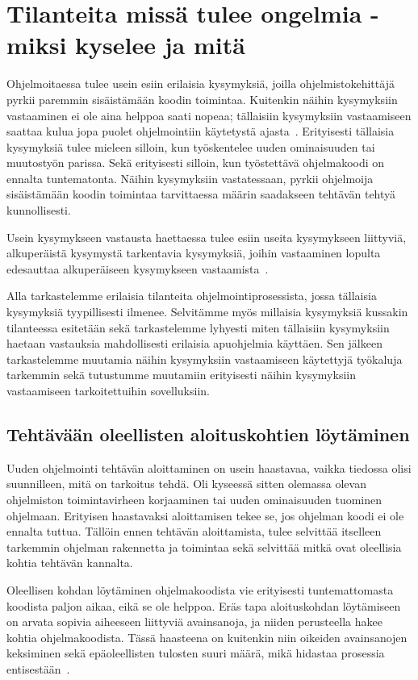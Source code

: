 \documentclass[finnish]{../tktltiki2}
\theoremstyle{definition}
\theoremstyle{remark}
\begin{document}
\section{Tilanteita missä tulee ongelmia - miksi kyselee ja mitä}
Ohjelmoitaessa tulee usein esiin erilaisia kysymyksiä, joilla ohjelmistokehittäjä pyrkii paremmin sisäistämään koodin toimintaa. Kuitenkin näihin kysymyksiin vastaaminen ei ole aina helppoa saati nopeaa; tällaisiin kysymyksiin vastaamiseen saattaa kulua jopa puolet ohjelmointiin käytetystä ajasta~\cite{eliciting-design-requirements-for-maintenance-oriented-ides}. Erityisesti tällaisia kysymyksiä tulee mieleen silloin, kun työskentelee uuden ominaisuuden tai muutostyön parissa. Sekä erityisesti silloin, kun työstettävä ohjelmakoodi on ennalta tuntematonta.
Näihin kysymyksiin vastatessaan, pyrkii ohjelmoija sisäistämään koodin toimintaa tarvittaessa määrin saadakseen tehtävän tehtyä kunnollisesti.

Usein kysymykseen vastausta haettaessa tulee esiin useita kysymykseen liittyviä, alkuperäistä kysymystä tarkentavia kysymyksiä, joihin vastaaminen lopulta edesauttaa alkuperäiseen kysymykseen vastaamista~\cite{questions-during-software-evolution-tasks}.

Alla tarkastelemme erilaisia tilanteita ohjelmointiprosessista, jossa tällaisia kysymyksiä tyypillisesti ilmenee. Selvitämme myös millaisia kysymyksiä kussakin tilanteessa esitetään sekä tarkastelemme lyhyesti miten tällaisiin kysymyksiin haetaan vastauksia mahdollisesti erilaisia apuohjelmia käyttäen. Sen jälkeen tarkastelemme muutamia näihin kysymyksiin vastaamiseen käytettyjä työkaluja tarkemmin sekä tutustumme muutamiin erityisesti näihin kysymyksiin vastaamiseen tarkoitettuihin sovelluksiin.

\subsection{Tehtävään oleellisten aloituskohtien löytäminen}
Uuden ohjelmointi tehtävän aloittaminen on usein haastavaa, vaikka tiedossa olisi suunnilleen, mitä on tarkoitus tehdä. Oli kyseessä sitten olemassa olevan ohjelmiston toimintavirheen korjaaminen tai uuden ominaisuuden tuominen ohjelmaan. Erityisen haastavaksi aloittamisen tekee se, jos ohjelman koodi ei ole ennalta tuttua. Tällöin ennen tehtävän aloittamista, tulee selvittää itselleen tarkemmin ohjelman rakennetta ja toimintaa sekä selvittää mitkä ovat oleellisia kohtia tehtävän kannalta.

Oleellisen kohdan löytäminen ohjelmakoodista vie erityisesti tuntemattomasta koodista paljon aikaa, eikä se ole helppoa.
Eräs tapa aloituskohdan löytämiseen on arvata sopivia aiheeseen liittyviä avainsanoja, ja niiden perusteella hakee kohtia ohjelmakoodista. Tässä haasteena on kuitenkin niin oikeiden avainsanojen keksiminen sekä epäoleellisten tulosten suuri määrä, mikä hidastaa prosessia entisestään~\cite{what-to-search-for}.
\end{document}
